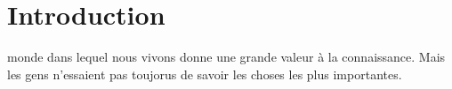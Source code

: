


\chapter{Introduction}


 monde dans lequel nous vivons donne une grande valeur à la
 connaissance. Mais les gens n'essaient pas toujorus de savoir les choses les
 plus importantes.




